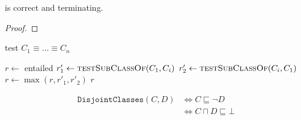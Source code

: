 \documentclass[paper.tex]{subfiles}
\begin{document}
%
%
%

\begin{theorem}
   is correct and terminating.
\end{theorem}
\begin{proof}
\end{proof}


\begin{algorithm}[H]
  \caption{test $C_1 \equiv \ldots \equiv C_n$}
  \begin{algorithmic}[1]
    \raggedright
      \State $r \gets$ entailed
        \State $r'_1 \gets \Call{testSubClassOf}{C_1, C_i}$
        \State $r'_2 \gets \Call{testSubClassOf}{C_i, C_1}$
        \State $r \gets \max(r, r'_1, r'_2)$
      \EndFor
      \State \Return $r$
    \EndFunction
  \end{algorithmic}
\end{algorithm}


\begin{align*}
  \mathtt{DisjointClasses}(C, D)
  &\iff C \sqsubseteq \neg D \\
  &\iff C \sqcap D \sqsubseteq \bot
\end{align*}
\end{document}
